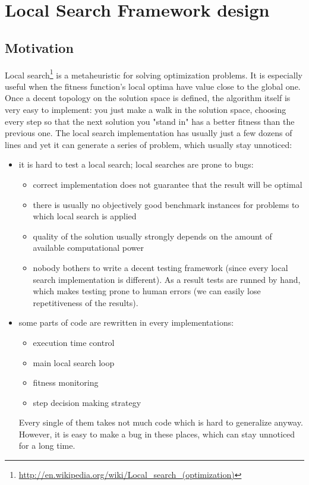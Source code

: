 \chapter{Local Search Framework design}

\section{Motivation}

Local search\footnote{\url{http://en.wikipedia.org/wiki/Local_search_(optimization)}} is a metaheuristic for solving optimization problems.
It is especially useful when the fitness function's local optima have value close to the global one.
Once a decent topology on the solution space is defined, the algorithm itself is very easy to implement:
you just make a walk in the solution space, choosing every step so that the next solution you "stand in" has
a better fitness than the previous one. The local search implementation has usually just a few dozens of lines and
yet it can generate a series of problem, which usually stay unnoticed:
\begin{itemize}
\item it is hard to test a local search; local searches are prone to bugs:
	\begin{itemize}
	\item correct implementation does not guarantee that the result will be optimal
	\item there is usually no objectively good benchmark instances for problems to which local search is applied
	\item quality of the solution usually strongly depends on the amount of available computational power
	\item nobody bothers to write a decent testing framework (since every local search implementation is different).
		As a result tests are runned by hand, which makes testing prone to human errors (we can easily lose repetitiveness of the results).
	\end{itemize}
\item some parts of code are rewritten in every implementations:
	\begin{itemize}
	\item execution time control
	\item main local search loop
	\item fitness monitoring
	\item step decision making strategy
	\end{itemize}
	Every single of them takes not much code which is hard to generalize anyway.
	However, it is easy to make a bug in these places, which can stay unnoticed for a long time.
\end{itemize}

